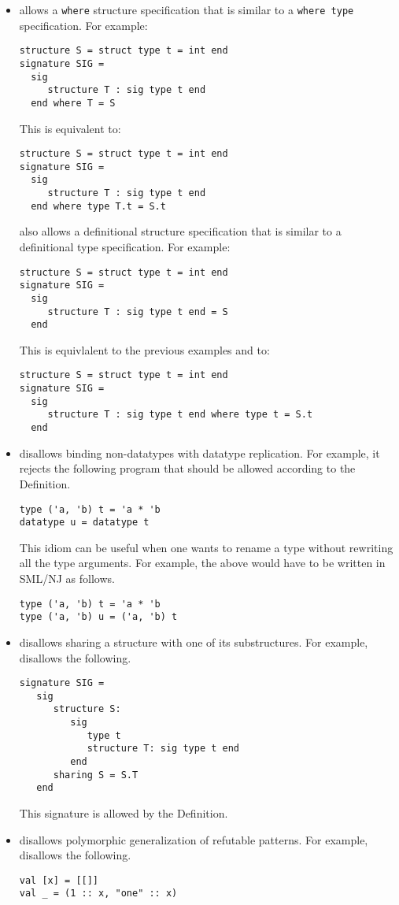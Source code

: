\begin{itemize}
\item
{\smlnj} allows a {\tt where} structure specification that is similar
to a {\tt where type} specification.  For example:
\begin{verbatim}
structure S = struct type t = int end
signature SIG =
  sig
     structure T : sig type t end
  end where T = S
\end{verbatim}
This is equivalent to:
\begin{verbatim}
structure S = struct type t = int end
signature SIG =
  sig
     structure T : sig type t end
  end where type T.t = S.t
\end{verbatim}
{\smlnj} also allows a definitional structure specification that is
similar to a definitional type specification.  For example:
\begin{verbatim}
structure S = struct type t = int end
signature SIG =
  sig
     structure T : sig type t end = S
  end
\end{verbatim}
This is equivlalent to the previous examples and to:
\begin{verbatim}
structure S = struct type t = int end
signature SIG =
  sig
     structure T : sig type t end where type t = S.t
  end
\end{verbatim}
%
\item
{\smlnj} disallows binding non-datatypes with datatype replication.
For example, it rejects the following program that should be allowed
according to the Definition.
\begin{verbatim}
type ('a, 'b) t = 'a * 'b
datatype u = datatype t
\end{verbatim}
This idiom can be useful when one wants to rename a type without
rewriting all the type arguments.  For example, the above would have
to be written in SML/NJ as follows.
\begin{verbatim}
type ('a, 'b) t = 'a * 'b
type ('a, 'b) u = ('a, 'b) t
\end{verbatim}
%
\item
{\smlnj} disallows sharing a structure with one of its substructures.
For example, {\smlnj} disallows the following.
\begin{verbatim}
signature SIG =
   sig
      structure S:
         sig
            type t
            structure T: sig type t end
         end
      sharing S = S.T
   end
\end{verbatim}
This signature is allowed by the Definition.

\item
{\smlnj} disallows polymorphic generalization of refutable patterns.
For example, {\smlnj} disallows the following.
\begin{verbatim}
val [x] = [[]]
val _ = (1 :: x, "one" :: x)
\end{verbatim}

\end{itemize}

